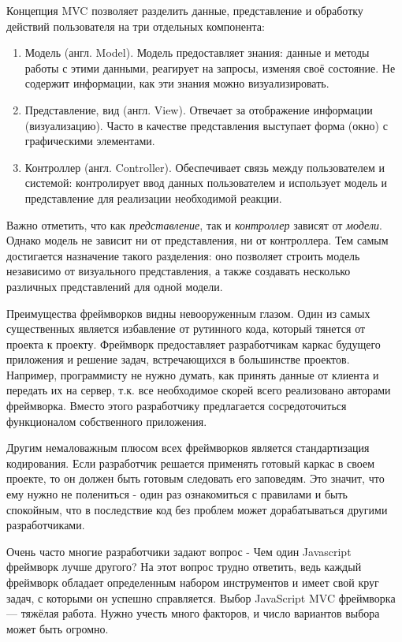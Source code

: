 Концепция MVC позволяет разделить данные, представление и обработку действий пользователя на три отдельных компонента:
\begin{enumerate}
\item Модель (англ. Model). Модель предоставляет знания: данные и методы работы с этими данными, реагирует на запросы, изменяя своё состояние. Не содержит информации, как эти знания можно визуализировать.
\item Представление, вид (англ. View). Отвечает за отображение информации (визуализацию). Часто в качестве представления выступает форма (окно) с графическими элементами.
\item Контроллер (англ. Controller). Обеспечивает связь между пользователем и системой: контролирует ввод данных пользователем и использует модель и представление для реализации необходимой реакции.
\end{enumerate}

Важно отметить, что как {\itshape представление}, так и {\itshape контроллер} зависят от {\itshape модели}. Однако модель не зависит ни от представления, ни от контроллера. Тем самым достигается назначение такого разделения: оно позволяет строить модель независимо от визуального представления, а также создавать несколько различных представлений для одной модели.


Преимущества фреймворков видны невооруженным глазом. Один из самых существенных является избавление от рутинного кода, который тянется от проекта к проекту. Фреймворк предоставляет разработчикам каркас будущего приложения и решение задач, встречающихся в большинстве проектов. Например, программисту не нужно думать, как принять данные от клиента и передать их на сервер, т.к. все необходимое скорей всего реализовано авторами фреймворка. Вместо этого разработчику предлагается сосредоточиться функционалом собственного приложения.

Другим немаловажным плюсом всех фреймворков является стандартизация кодирования. Если разработчик решается применять готовый каркас в своем проекте, то он должен быть готовым следовать его заповедям. Это значит, что ему нужно не полениться - один раз ознакомиться с правилами и быть спокойным, что в последствие код без проблем может дорабатываться другими разработчиками. 

Очень часто многие разработчики задают вопрос -  Чем один Javascript фреймворк лучше другого? На этот вопрос трудно ответить, ведь каждый фреймворк обладает определенным набором инструментов и имеет свой круг задач, с которыми он успешно справляется. Выбор JavaScript MVC фреймворка — тяжёлая работа. Нужно учесть много факторов, и число вариантов выбора может быть огромно. 


